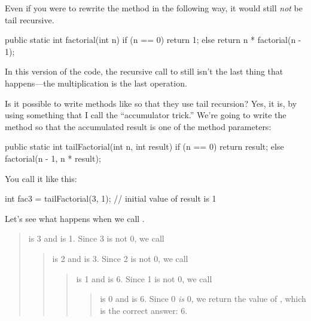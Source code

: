 Even if you were to rewrite the  method in the following way, it would still {\em not} be tail recursive.

\begin{code}
public static int factorial(int n) {
    if (n == 0) {
        return 1;
    } else {
        return n * factorial(n - 1);
    }
}
\end{code}

In this version of the code, the recursive call to  still isn't the last thing that happens---the multiplication is the last operation.

Is it possible to write methods like  so that they use tail recursion? Yes, it is, by using something that I call the ``accumulator trick.'' We're going to write the method so that the accumulated result is one of the method parameters:

\begin{code}
public static int tailFactorial(int n, int result) {
    if (n == 0) {
        return result;
    } else {
        factorial(n - 1, n * result);
    }
}
\end{code}

You call it like this:

\begin{code}
int fac3 = tailFactorial(3, 1); // initial value of result is 1
\end{code}

Let's see what happens when we call .

\vspace{-1ex}
\begin{quote}
 is 3 and  is 1. Since 3 is not 0, we call 
\begin{quote}
 is 2 and  is 3. Since 2 is not 0, we call 
\begin{quote}
 is 1 and  is 6. Since 1 is not 0, we call 
\begin{quote}
 is 0 and  is 6. Since 0 {\em is} 0, we return the value of , which is the correct answer: 6.
\end{quote}
\end{quote}
\end{quote}
\end{quote}
\vspace{-1ex}

